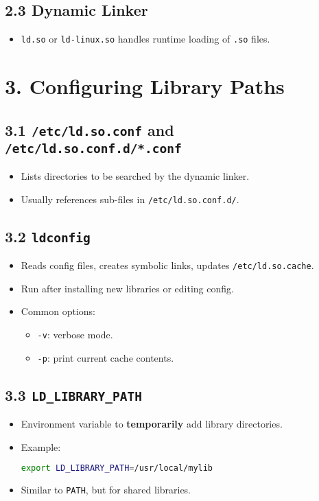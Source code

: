 \documentclass[12pt,a4paper]{report}
\begin{document}
\subsection*{2.3 Dynamic Linker}
\begin{itemize}
    \item \texttt{ld.so} or \texttt{ld-linux.so} handles runtime loading of \texttt{.so} files.
\end{itemize}

 

\section*{3. Configuring Library Paths}

\subsection*{3.1 \texttt{/etc/ld.so.conf} and \texttt{/etc/ld.so.conf.d/*.conf}}
\begin{itemize}
    \item Lists directories to be searched by the dynamic linker.  
    \item Usually references sub-files in \texttt{/etc/ld.so.conf.d/}.
\end{itemize}

\subsection*{3.2 \texttt{ldconfig}}
\begin{itemize}
    \item Reads config files, creates symbolic links, updates \texttt{/etc/ld.so.cache}.  
    \item Run after installing new libraries or editing config.  
    \item Common options:  
    \begin{itemize}
        \item \texttt{-v}: verbose mode.  
        \item \texttt{-p}: print current cache contents.
    \end{itemize}
\end{itemize}

\subsection*{3.3 \texttt{LD\_LIBRARY\_PATH}}
\begin{itemize}
    \item Environment variable to \textbf{temporarily} add library directories.  
    \item Example:
    \begin{lstlisting}[language=bash]
    export LD_LIBRARY_PATH=/usr/local/mylib
    \end{lstlisting}
    \item Similar to \texttt{PATH}, but for shared libraries.
\end{itemize}
\end{document}
